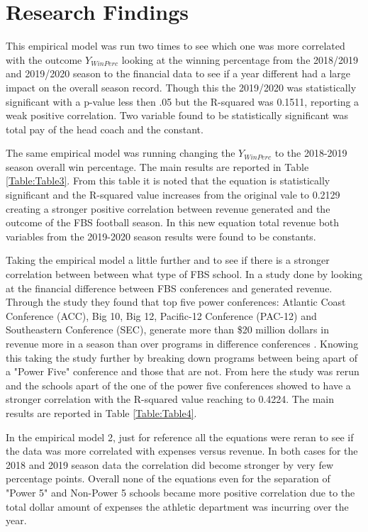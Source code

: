 \documentclass[12pt,english]{article}
\begin{document}
\section{Research Findings}\label{sec:results}
This empirical model was run two times to see which one was more correlated with the outcome $Y_{WinPerc}$ looking at the winning percentage from the 2018/2019 and 2019/2020 season to the financial data to see if a year different had a large impact on the overall season record. Though this the 2019/2020 was statistically significant with a p-value less then .05 but the R-squared was 0.1511, reporting a weak positive correlation. Two variable found to be statistically significant was total pay of the head coach and the constant. 

The same empirical model was running changing the $Y_{WinPerc}$ to the 2018-2019 season overall win percentage. The main results are reported in Table \ref{Table:Table3}. From this table it is noted that the equation is statistically significant and the R-squared value increases from the original vale to 0.2129 creating a stronger positive correlation between revenue generated and the outcome of the FBS football season. In this new equation total revenue both variables from the 2019-2020 season results were found to be constants.

Taking the empirical model a little further and to see if there is a stronger correlation between between what type of FBS school. In a study done by \citet{Caro} looking at the financial difference between FBS conferences and generated revenue. Through the study they found that top five power conferences: Atlantic Coast Conference (ACC), Big 10, Big 12, Pacific-12 Conference (PAC-12) and Southeastern Conference (SEC), generate more than \$20 million dollars in revenue more in a season than over programs in difference conferences \citep{Caro}. Knowing this taking the study further by breaking down programs between being apart of a "Power Five" conference and those that are not. From here the study was rerun and the schools apart of the one of the power five conferences showed to have a stronger correlation with the R-squared value reaching to 0.4224. The main results are reported in Table \ref{Table:Table4}. 

In the empirical model 2, just for reference all the equations were reran to see if the data was more correlated with expenses versus revenue. In both cases for the 2018 and 2019 season data the correlation did become stronger by very few percentage points. Overall none of the equations even for the separation of "Power 5" and Non-Power 5 schools became more positive correlation due to the total dollar amount of expenses the athletic department was incurring over the year.   
\end{document}
